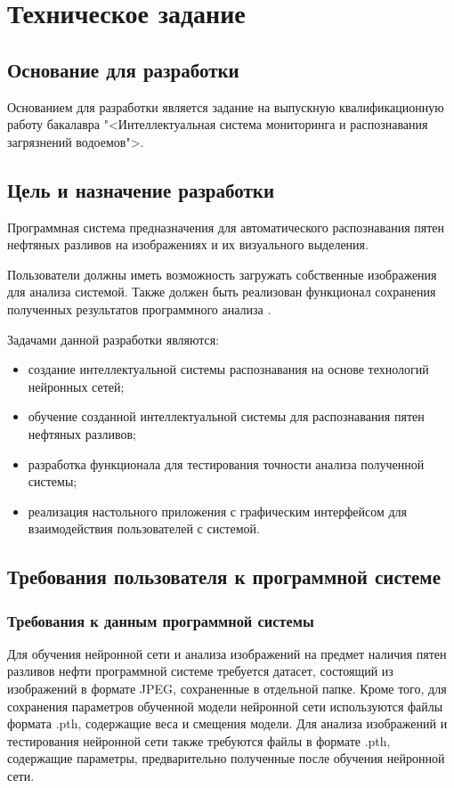 \section{Техническое задание}
\subsection{Основание для разработки}

Основанием для разработки является задание на выпускную квалификационную работу бакалавра "<Интеллектуальная система мониторинга и распознавания загрязнений водоемов">.

\subsection{Цель и назначение разработки}

Программная система предназначения для автоматического распознавания пятен нефтяных разливов на изображениях и их визуального выделения.

Пользователи должны иметь возможность загружать собственные изображения для анализа системой. Также должен быть реализован функционал сохранения полученных результатов программного анализа .

Задачами данной разработки являются:
\begin{itemize}
\item создание интеллектуальной системы распознавания на основе технологий нейронных сетей;
\item обучение созданной интеллектуальной системы для распознавания пятен нефтяных разливов;
\item разработка функционала для тестирования точности анализа полученной системы;
\item реализация настольного приложения с графическим интерфейсом для взаимодействия пользователей с системой.
\end{itemize}

\subsection{Требования пользователя к программной системе}

\subsubsection{Требования к данным программной системы}

Для обучения нейронной сети и анализа изображений на предмет наличия пятен разливов нефти программной системе требуется датасет, состоящий из изображений в формате JPEG, сохраненные в отдельной папке. Кроме того, для сохранения параметров обученной модели нейронной сети используются файлы формата .pth, содержащие веса и смещения модели. Для анализа изображений и тестирования нейронной сети также требуются файлы в формате .pth, содержащие параметры, предварительно полученные после обучения нейронной сети.

